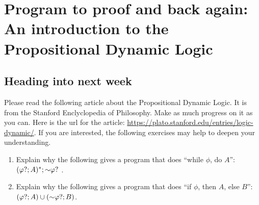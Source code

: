 \chapter[Week of Propositional Dynamic Logic]{Program to proof and back again: An introduction to the Propositional Dynamic Logic}

\setcounter{section}{-1}

\section{Heading into next week}

Please read the following article about the Propositional Dynamic Logic. It is from the Stanford Enclyclopedia of Philosophy.
Make as much progress on it as you can. Here is the url for the article: \url{https://plato.stanford.edu/entries/logic-dynamic/}.
If you are interested, the following exercises may help to deepen your understanding.

\begin{enumerate}
    \item Explain why the following gives a program that does ``while $\phi$, do $A$'':  $(\varphi ? ; A)^* ; \mathord{\sim} \varphi ?$ .
    \item Explain why the following gives a program that does ``if $\phi$, then $A$, else $B$'': $(\varphi ? ; A) \cup (\mathord{\sim} \varphi ? ; B)$.
\end{enumerate}


